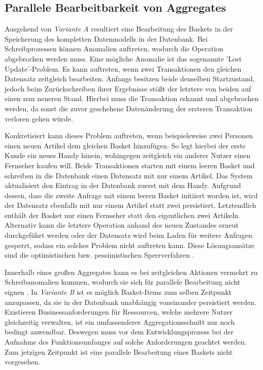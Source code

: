\subsection{Parallele Bearbeitbarkeit von Aggregates}

Ausgehend von \emph{Variante A} resultiert eine Bearbeitung des Baskets in der Speicherung des kompletten Datenmodells in der Datenbank. Bei Schreibprozessen können Anomalien auftreten, wodurch die Operation abgebrochen werden muss. Eine mögliche Anomalie ist das sogenannte 'Lost Update'-Problem. Es kann auftreten, wenn zwei Transaktionen den gleichen Datensatz zeitgleich bearbeiten. Anfangs besitzen beide denselben Startzustand, jedoch beim Zurückschreiben ihrer Ergebnisse stößt der letztere von beiden auf einen nun neueren Stand. Hierbei muss die Transaktion erkannt und abgebrochen werden, da sonst die zuvor geschehene Datenänderung der ersteren Transaktion verloren gehen würde.

Konkretisiert kann dieses Problem auftreten, wenn beispielsweise zwei Personen einen neuen Artikel dem gleichen Basket hinzufügen. So legt hierbei der erste Kunde ein neues Handy hinein, wohingegen zeitgleich ein anderer Nutzer einen Fernseher kaufen will. Beide Transaktionen starten mit einem leeren Basket und schreiben in die Datenbank einen Datensatz mit nur einem Artikel. Das System aktualisiert den Eintrag in der Datenbank zuerst mit dem Handy. Aufgrund dessen, dass die zweite Anfrage mit einem leeren Basket initiiert worden ist, wird der Datensatz ebenfalls mit nur einem Artikel statt zwei persistiert. Letztendlich enthält der Basket nur einen Fernseher statt den eigentlichen zwei Artikeln. Alternativ kann die letztere Operation anhand des neuen Zustandes erneut durchgeführt werden oder der Datensatz wird beim Laden für weitere Anfragen gesperrt, sodass ein solches Problem nicht auftreten kann. Diese Lösungsansätze sind die optimistischen bzw. pessimistischen Sperrverfahren \cite[S. 385f.]{Vernon.2015}.

Innerhalb eines großen Aggregates kann es bei zeitgleichen Aktionen vermehrt zu Schreibanomalien kommen, wodurch sie sich für parallele Bearbeitung nicht eignen \cite[S. 2]{Vernon.2011}. In \emph{Variante B} ist es möglich Basket-Items zum selben Zeitpunkt anzupassen, da sie in der Datenbank unabhängig voneinander persistiert werden. Existieren Businessanforderungen für Ressourcen, welche mehrere Nutzer gleichzeitig verwalten, ist ein umfassenderer Aggregationsschnitt nur noch bedingt anwendbar. Deswegen muss vor dem Entwicklungsprozess bei der Aufnahme des Funktionsumfanges auf solche Anforderungen geachtet werden. Zum jetzigen Zeitpunkt ist eine parallele Bearbeitung eines Baskets nicht vorgesehen.

